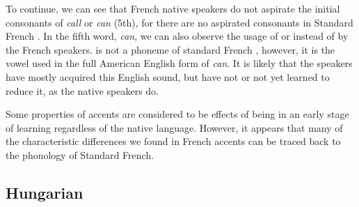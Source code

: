 \documentclass[output=paper]{LSP/langsci}
\begin{document}
To continue, we can see that French native speakers do not aspirate the initial consonants of \textit{call} or \textit{can} (5th), for there are no aspirated consonants in Standard French \citep[p. 35]{walker_pronunciation_1984}. In the fifth word, \textit{can}, we can also observe the usage of 
or 
instead of 
by the French speakers. 
is not a phoneme of standard French \citep{walker_french_2001}, however, it is the vowel used in the full American English form of \textit{can}. It is likely that the speakers have mostly acquired this English sound, but have not or not yet learned to reduce it, as the native speakers do.

Some properties of accents are considered to be effects of being in an early stage of learning regardless of the native language. However, it appears that many of the characteristic differences we found in French accents can be traced back to the phonology of Standard French.

\subsection{Hungarian}
\end{document}
